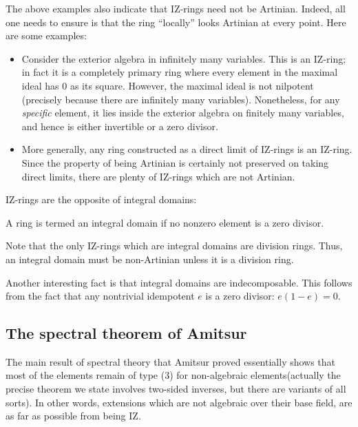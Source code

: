 \documentclass[a4paper]{amsart}
\begin{document}
The above examples also indicate that IZ-rings need not be
Artinian. Indeed, all one needs to ensure is that the ring ``locally''
looks Artinian at every point. Here are some examples:

\begin{itemize}

\item Consider the exterior algebra in infinitely many variables. This
  is an IZ-ring; in fact it is a completely primary ring where every
  element in the maximal ideal has $0$ as its square. However, the
  maximal ideal is not nilpotent (precisely because there are
  infinitely many variables). Nonetheless, for any {\em specific}
  element, it lies inside the exterior algebra on finitely many
  variables, and hence is either invertible or a zero divisor.

\item More generally, any ring constructed as a direct limit of
  IZ-rings is an IZ-ring. Since the property of being Artinian is
  certainly not preserved on taking direct limits, there are plenty of
  IZ-rings which are not Artinian.

\end{itemize}

IZ-rings are the opposite of integral domains:

\begin{definer}
  A ring is termed an integral domain if no nonzero element is a zero
  divisor.
\end{definer}

Note that the only IZ-rings which are integral domains are division
rings. Thus, an integral domain must be non-Artinian unless it is a
division ring.

Another interesting fact is that integral domains are indecomposable.
This follows from the fact that any nontrivial idempotent $e$ is a
zero divisor: $e(1 - e) = 0$. 

\subsection{The spectral theorem of Amitsur}

The main result of spectral theory that Amitsur proved essentially
shows that most of the elements remain of type (3) for non-algebraic
elements(actually the precise theorem we state involves two-sided
inverses, but there are variants of all sorts). In other words,
extensions which are not algebraic over their base field, are as far
as possible from being IZ.
\end{document}
